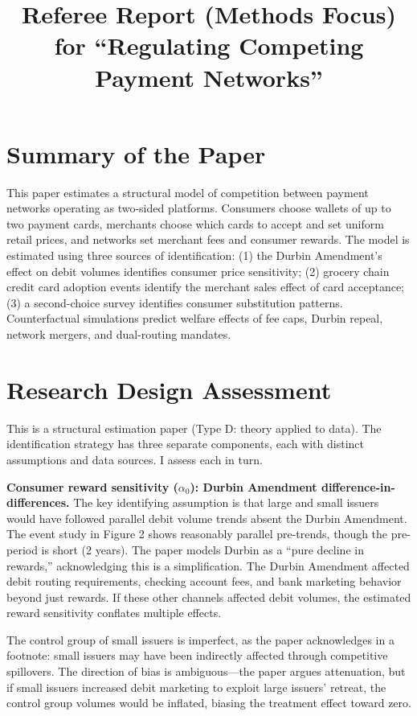 \documentclass[11pt]{article}
\begin{document}
\title{Referee Report (Methods Focus)\\for ``Regulating Competing Payment Networks''}
\author{}
\date{}
\maketitle

\section{Summary of the Paper}

This paper estimates a structural model of competition between payment networks operating as two-sided platforms. Consumers choose wallets of up to two payment cards, merchants choose which cards to accept and set uniform retail prices, and networks set merchant fees and consumer rewards. The model is estimated using three sources of identification: (1) the Durbin Amendment's effect on debit volumes identifies consumer price sensitivity; (2) grocery chain credit card adoption events identify the merchant sales effect of card acceptance; (3) a second-choice survey identifies consumer substitution patterns. Counterfactual simulations predict welfare effects of fee caps, Durbin repeal, network mergers, and dual-routing mandates.

\section{Research Design Assessment}

This is a structural estimation paper (Type D: theory applied to data). The identification strategy has three separate components, each with distinct assumptions and data sources. I assess each in turn.

\textbf{Consumer reward sensitivity ($\alpha_0$): Durbin Amendment difference-in-differences.} The key identifying assumption is that large and small issuers would have followed parallel debit volume trends absent the Durbin Amendment. The event study in Figure 2 shows reasonably parallel pre-trends, though the pre-period is short (2 years). The paper models Durbin as a ``pure decline in rewards,'' acknowledging this is a simplification. The Durbin Amendment affected debit routing requirements, checking account fees, and bank marketing behavior beyond just rewards. If these other channels affected debit volumes, the estimated reward sensitivity conflates multiple effects.

The control group of small issuers is imperfect, as the paper acknowledges in a footnote: small issuers may have been indirectly affected through competitive spillovers. The direction of bias is ambiguous---the paper argues attenuation, but if small issuers increased debit marketing to exploit large issuers' retreat, the control group volumes would be inflated, biasing the treatment effect toward zero.
\end{document}

